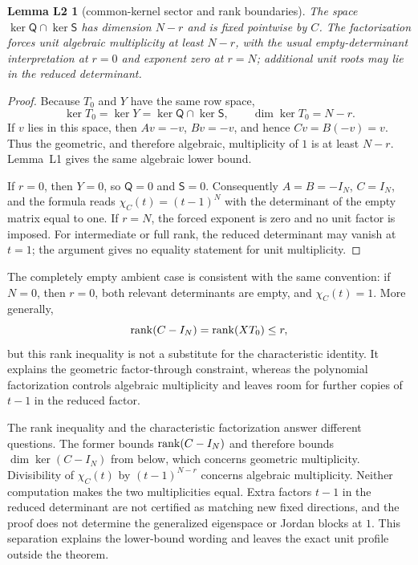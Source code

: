 \documentclass[11pt,letterpaper]{article}
\theoremstyle{plain}
\newtheorem*{lemLtwo}{Lemma L2}
\begin{document}
\begin{lemLtwo}[common-kernel sector and rank boundaries]
The space $\ker\mathsf Q\cap\ker\mathsf S$ has dimension $N-r$ and is fixed pointwise by $C$.  The factorization forces unit algebraic multiplicity at least $N-r$, with the usual empty-determinant interpretation at $r=0$ and exponent zero at $r=N$; additional unit roots may lie in the reduced determinant.
\end{lemLtwo}

\begin{proof}
Because $T_0$ and $Y$ have the same row space,
\[
\ker T_0=\ker Y=\ker\mathsf Q\cap\ker\mathsf S,
\qquad \dim\ker T_0=N-r.
\]
If $v$ lies in this space, then $Av=-v$, $Bv=-v$, and hence $Cv=B(-v)=v$.  Thus the geometric, and therefore algebraic, multiplicity of $1$ is at least $N-r$.  Lemma~L1 gives the same algebraic lower bound.

If $r=0$, then $Y=0$, so $\mathsf Q=0$ and $\mathsf S=0$.  Consequently $A=B=-I_N$, $C=I_N$, and the formula reads $\chi_C(t)=(t-1)^N$ with the determinant of the empty matrix equal to one.  If $r=N$, the forced exponent is zero and no unit factor is imposed.  For intermediate or full rank, the reduced determinant may vanish at $t=1$; the argument gives no equality statement for unit multiplicity.
\end{proof}

The completely empty ambient case is consistent with the same convention: if $N=0$, then $r=0$, both relevant determinants are empty, and $\chi_C(t)=1$.  More generally,
\[
\operatorname{rank}(C-I_N)=\operatorname{rank}(XT_0)\leq r,
\]
but this rank inequality is not a substitute for the characteristic identity.  It explains the geometric factor-through constraint, whereas the polynomial factorization controls algebraic multiplicity and leaves room for further copies of $t-1$ in the reduced factor.

The rank inequality and the characteristic factorization answer different questions.  The former bounds $\operatorname{rank}(C-I_N)$ and therefore bounds $\dim\ker(C-I_N)$ from below, which concerns geometric multiplicity.  Divisibility of $\chi_C(t)$ by $(t-1)^{N-r}$ concerns algebraic multiplicity.  Neither computation makes the two multiplicities equal.  Extra factors $t-1$ in the reduced determinant are not certified as matching new fixed directions, and the proof does not determine the generalized eigenspace or Jordan blocks at $1$.  This separation explains the lower-bound wording and leaves the exact unit profile outside the theorem.
\end{document}
